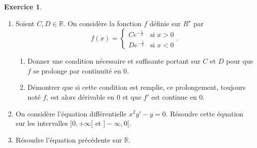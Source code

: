 \documentclass[a4paper, 11pt,openany]{article}%
\theoremstyle{plain}
\theoremstyle{definition}
\newtheorem{exo}{Exercice}
\theoremstyle{remark}
\newcommand{\R}{\mathbb{R}}
\newcommand{\D}{\mathbb{D}}
\begin{document}
\begin{exo}
\begin{enumerate}
\item Soient $C,D \in \R$. On considère la fonction $f$ définie sur $R^{\star}$ par 
$$f(x) = \begin{cases}C e^{-\frac{1}{x}}&\text{si } x > 0\\D e^{-\frac{1}{x}}&\text{si } x < 0
\end{cases}.$$
\begin{enumerate}
\item Donner une condition nécessaire et suffisante portant sur $C$ et $D$ pour que $f$ se prolonge par continuité en $0$.
\item Démontrer que si cette condition est remplie, ce prolongement, toujours noté $f$, est alors dérivable en 0 et que $f'
$ est continue en 0. 
\end{enumerate}
\item On considère l'équation différentielle $x^2 y'-y=0$.
Résoudre cette équation sur les intervalles $]0,+ \infty[$ et $]- \infty,0[$.
\item Résoudre l'équation précédente sur $\R$. 
\end{enumerate} 
\end{exo}
\end{document}
